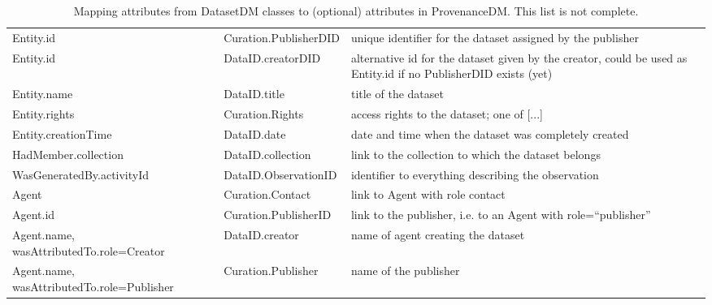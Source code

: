 \begin{table}[ht]
\small
{}\textwidth
\begin{tabulary}{1.0\textwidth}{LlL}
\toprule
{} &  & \\
\midrule
Entity.id                & Curation.PublisherDID  & unique identifier for the dataset assigned by the publisher\\
Entity.id                & DataID.creatorDID      &  alternative id for the dataset given by the creator, could be used as Entity.id if no PublisherDID exists (yet)\\
Entity.name              & DataID.title           & title of the dataset\\
Entity.rights            & Curation.Rights        & access rights to the dataset; one of [...]\\
Entity.creationTime      & DataID.date            & date and time when the dataset was completely created\\
HadMember.collection     & DataID.collection     & link to the collection to which the dataset belongs\\
WasGeneratedBy.activityId & DataID.ObservationID  & identifier to everything describing the observation\\
Agent                    & Curation.Contact       & link to Agent with role contact\\
Agent.id                 & Curation.PublisherID   & link to the publisher, i.e. to an Agent with role=``publisher''\\
Agent.name, \newline wasAttributedTo.role=\newline Creator               & DataID.creator         & name of agent creating the dataset\\
Agent.name, \newline wasAttributedTo.role=\newline Publisher               & Curation.Publisher     & name of the publisher\\
\bottomrule
\end{tabulary}
\caption[Mapping attributes from DatasetDM classes to attributes in ProvenanceDM]{Mapping attributes from DatasetDM classes to (optional) attributes in ProvenanceDM. This list is not complete.}
\label{tab:datasetmapping}
\end{table}


